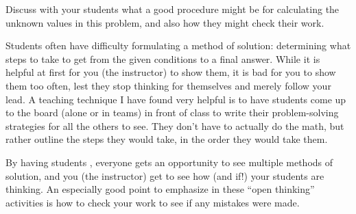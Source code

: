 \vskip 10pt

Discuss with your students what a good procedure might be for calculating the unknown values in this problem, and also how they might check their work.

\vskip 10pt

Students often have difficulty formulating a method of solution: determining what steps to take to get from the given conditions to a final answer.  While it is helpful at first for you (the instructor) to show them, it is bad for you to show them too often, lest they stop thinking for themselves and merely follow your lead.  A teaching technique I have found very helpful is to have students come up to the board (alone or in teams) in front of class to write their problem-solving strategies for all the others to see.  They don't have to actually do the math, but rather outline the steps they would take, in the order they would take them.

By having students , everyone gets an opportunity to see multiple methods of solution, and you (the instructor) get to see how (and if!) your students are thinking.  An especially good point to emphasize in these ``open thinking'' activities is how to check your work to see if any mistakes were made.



